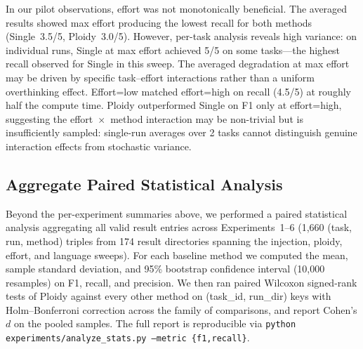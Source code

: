 \documentclass[11pt]{article}
\begin{document}
In our pilot observations, effort was not monotonically beneficial. The averaged results showed max effort producing the lowest recall for both methods (Single~3.5/5, Ploidy~3.0/5). However, per-task analysis reveals high variance: on individual runs, Single at max effort achieved 5/5 on some tasks---the highest recall observed for Single in this sweep. The averaged degradation at max effort may be driven by specific task--effort interactions rather than a uniform overthinking effect. Effort=low matched effort=high on recall (4.5/5) at roughly half the compute time. Ploidy outperformed Single on F1 only at effort=high, suggesting the effort~$\times$~method interaction may be non-trivial but is insufficiently sampled: single-run averages over 2 tasks cannot distinguish genuine interaction effects from stochastic variance.

\subsection{Aggregate Paired Statistical Analysis}
\label{sec:aggregate-stats}

Beyond the per-experiment summaries above, we performed a paired statistical analysis aggregating all valid result entries across Experiments~1--6 (1{,}660 (task, run, method) triples from 174 result directories spanning the injection, ploidy, effort, and language sweeps). For each baseline method we computed the mean, sample standard deviation, and 95\% bootstrap confidence interval (10{,}000 resamples) on F1, recall, and precision. We then ran paired Wilcoxon signed-rank tests of Ploidy against every other method on (task\_id, run\_dir) keys with Holm--Bonferroni correction across the family of comparisons, and report Cohen's $d$ on the pooled samples. The full report is reproducible via \texttt{python experiments/analyze\_stats.py --metric \{f1,recall\}}.
\end{document}
